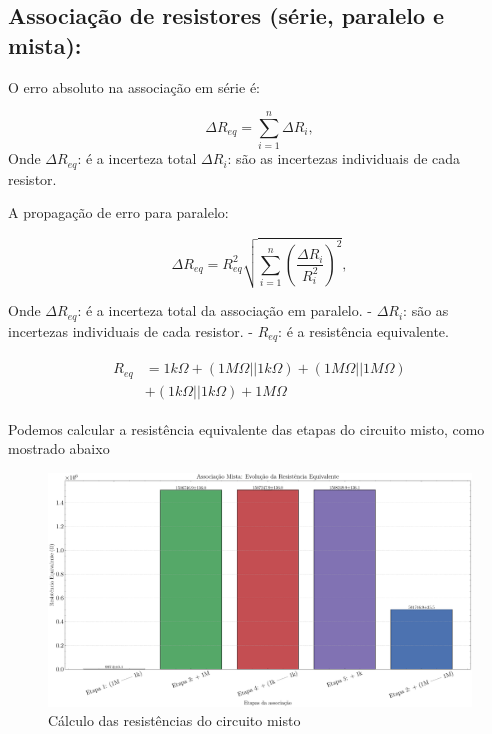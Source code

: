 \documentclass[conference]{IEEEtran}
\begin{document}
\subsection{Associação de resistores (série, paralelo e mista):}

O erro absoluto na associação em série é: %

\begin{equation}
    \Delta R_{eq} = \sum_{i=1}^{n} \Delta R_i,
\end{equation}
\noindent
Onde $\Delta R_{eq}$: é a incerteza total $\Delta R_i$: são as incertezas individuais de cada resistor.

A propagação de erro para paralelo:

\begin{equation}
    \Delta R_{eq} = R_{eq}^2 \sqrt{\sum_{i=1}^{n} \left(\frac{\Delta R_i}{R_i^2}\right)^2},
\end{equation}

Onde $\Delta R_{eq}$: é a incerteza total da associação em paralelo.
- $\Delta R_i$: são as incertezas individuais de cada resistor.
- $R_{eq}$: é a resistência equivalente.



\begin{align*}
    \begin{split}
        R_{eq} & = 1k\Omega + \left(1M\Omega || 1k\Omega\right) + \left(1M\Omega || 1M\Omega\right) \\
               & + \left(1k\Omega || 1k\Omega\right) + 1M\Omega                                     %
    \end{split}
\end{align*}

\noindent
Podemos calcular a resistência equivalente das etapas do circuito misto, como mostrado abaixo

\begin{figure}[htbp]
    \centering
    \caption{Cálculo das resistências do circuito misto}
    \label{fig:plot_assoc_mista}
    \includegraphics[width=0.8\linewidth]{figures/plot_assoc_mista.pdf}
\end{figure}
\end{document}
